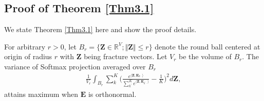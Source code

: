 \subsection{Proof of Theorem \ref{Thm3.1}}
We state Theorem \ref{Thm3.1} here and show the proof details.
\begin{theorem}
	For arbitrary $r > 0$, let $B_r = \{\mathcal{\bm Z} \in \mathbb{R}^V; \Vert \mathcal{\bm Z} \Vert \leq r\}$ denote the round ball centered at origin of radius $r$ with $\mathcal{\bm Z}$ being fracture vectors. Let $V_r$ be the volume of $B_r$. The variance of Softmax projection averaged over $B_r$
	\begin{align}
		\frac{1}{V_r} \int_{B_r} \sum_k^K \Big( \frac{e^{\langle \mathcal{\bm Z}, \bm E_{k\cdot}\rangle} }{\sum_{k^{\prime}}^K e^{\langle \mathcal{\bm Z}, \bm E_{k^{\prime}\cdot}\rangle}} - \frac{1}{K} \Big)^2 d \mathcal{\bm Z},
	\end{align}
	attains maximum when $\bm E$ is orthonormal.
\end{theorem}
